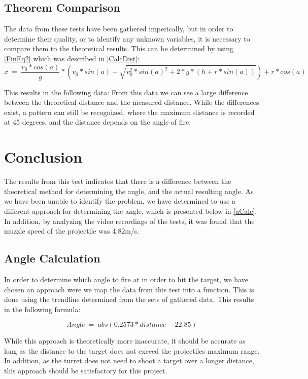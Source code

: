 \subsection{Theorem Comparison}
The data from these tests have been gathered imperically, but in order to
determine their quality, or to identify any unknown variables, it is necessary
to compare them to the theoretical results. This can be determined by using
\autoref{FinEq2} which was described in \autoref{CalcDist}:
\begin{equation}\label{FinEq2}
x\ =\ \frac{v_0*cos(a)}{g}* \left(
v_0*sin(a)+\sqrt{v_0^2*sin(a)^2+2*g*(h+r*sin(a))}\right)+r*cos(a)
\end{equation}

This results in the following data:
From this data we can see a large difference between the theoretical distance
and the measured distance. While the differences exist, a pattern can still be
recognized, where the maximum distance is recorded at 45 degrees, and the
distance depends on the angle of fire. 

\section{Conclusion}
The results from this test indicates that there is a difference between the
theoretical method for determining the angle, and the actual resulting angle. As
we have been unable to identify the problem, we have determined to use a
different approach for determining the angle, which is presented below in
\autoref{aCalc}. In addition, by analyzing the video recordings of the tests, it
was found that the muzzle speed of the projectile was 4.82m/s.

\subsection{Angle Calculation}\label{aCalc}
In order to determine which angle to fire at in order to hit the target, we have
chosen an approach were we map the data from this test into a function. This is
done using the trendline determined from the sets of gathered data. This results
in the following formula:

\begin{equation}\label{angleCalc}
Angle\ =\ abs(0.2573 * distance - 22.85)
\end{equation} 

While this approach is theoretically more inaccurate, it should be
accurate as long as the distance to the target does not exceed the projectiles
maximum range. In addition, as the turret does not need to shoot a target over a
longer distance, this approach should be satisfactory for this project.
